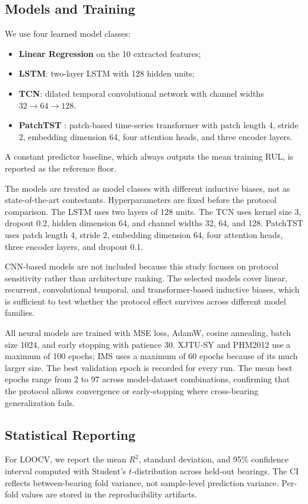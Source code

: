 \documentclass[pdflatex,sn-mathphys-num]{sn-jnl}
\begin{document}
\subsection{Models and Training}
We use four learned model classes:
\begin{itemize}
    \item \textbf{Linear Regression} on the 10 extracted features;
    \item \textbf{LSTM}: two-layer LSTM with 128 hidden units;
    \item \textbf{TCN}: dilated temporal convolutional network with channel widths $32 \to 64 \to 128$.
    \item \textbf{PatchTST} \cite{patchtst2023}: patch-based time-series transformer with patch length 4, stride 2, embedding dimension 64, four attention heads, and three encoder layers.
\end{itemize}
A constant predictor baseline, which always outputs the mean training RUL, is reported as the reference floor.

The models are treated as model classes with different inductive biases, not as state-of-the-art contestants. Hyperparameters are fixed before the protocol comparison. The LSTM uses two layers of 128 units. The TCN uses kernel size 3, dropout 0.2, hidden dimension 64, and channel widths 32, 64, and 128. PatchTST uses patch length 4, stride 2, embedding dimension 64, four attention heads, three encoder layers, and dropout 0.1.

CNN-based models are not included because this study focuses on protocol sensitivity rather than architecture ranking. The selected models cover linear, recurrent, convolutional temporal, and transformer-based inductive biases, which is sufficient to test whether the protocol effect survives across different model families.

All neural models are trained with MSE loss, AdamW, cosine annealing, batch size 1024, and early stopping with patience 30. XJTU-SY and PHM2012 use a maximum of 100 epochs; IMS uses a maximum of 60 epochs because of its much larger size. The best validation epoch is recorded for every run. The mean best epochs range from 2 to 97 across model-dataset combinations, confirming that the protocol allows convergence or early-stopping where cross-bearing generalization fails.

\subsection{Statistical Reporting}
For LOOCV, we report the mean $R^2$, standard deviation, and 95\% confidence interval computed with Student's $t$-distribution across held-out bearings. The CI reflects between-bearing fold variance, not sample-level prediction variance. Per-fold values are stored in the reproducibility artifacts.
\end{document}
